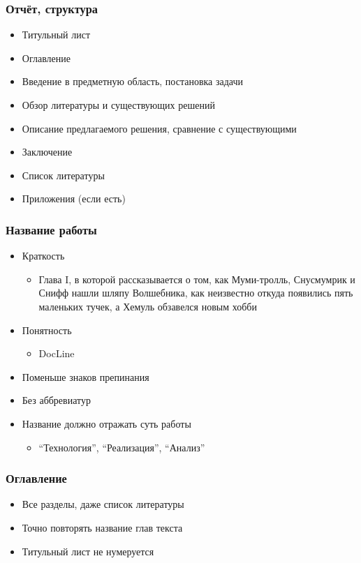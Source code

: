 \documentclass[xetex,mathserif,serif]{beamer}
\begin{document}
	\begin{frame}
		\frametitle{Отчёт, структура}
		\begin{itemize}
			\item Титульный лист
			\item Оглавление
			\item Введение в предметную область, постановка задачи
			\item Обзор литературы и существующих решений
			\item Описание предлагаемого решения, сравнение с существующими
			\item Заключение
			\item Список литературы
			\item Приложения (если есть)
		\end{itemize}
	\end{frame}

	\begin{frame}
		\frametitle{Название работы}
		\begin{itemize}
			\item Краткость
			\begin{itemize}
				\item Глава I, в которой рассказывается о том, как Муми-тролль, Снусмумрик и Снифф нашли шляпу Волшебника, как неизвестно откуда появились пять маленьких тучек, а Хемуль обзавелся новым хобби
			\end{itemize}
			\item Понятность
			\begin{itemize}
				\item DocLine
			\end{itemize}
			\item Поменьше знаков препинания
			\item Без аббревиатур
			\item Название должно отражать суть работы
			\begin{itemize}
				\item ``Технология'', ``Реализация'', ``Анализ''
			\end{itemize}
		\end{itemize}
	\end{frame}

	\begin{frame}
		\frametitle{Оглавление}
		\begin{itemize}
			\item Все разделы, даже список литературы
			\item Точно повторять название глав текста
			\item Титульный лист не нумеруется
		\end{itemize}
	\end{frame}
\end{document}
